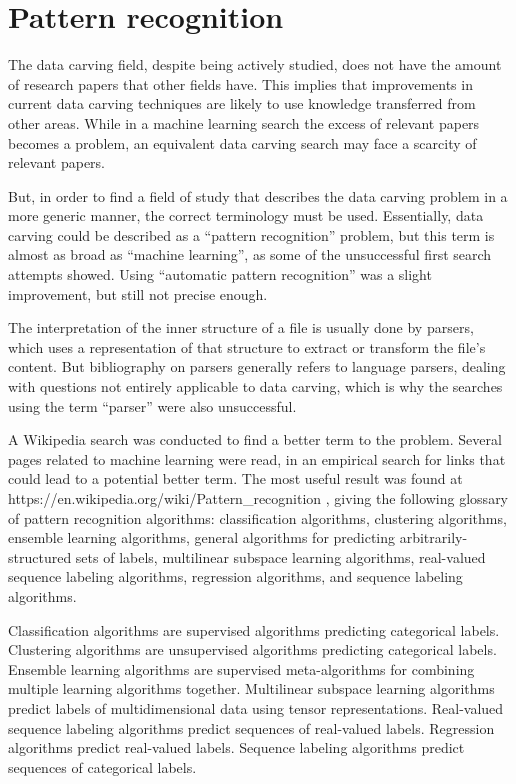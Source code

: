 \section {Pattern recognition}
The data carving field, despite being actively studied, does not have the amount of research papers that other fields have. This implies that improvements in current data carving techniques are likely to use knowledge transferred from other areas. While in a machine learning search the excess of relevant papers becomes a problem, an equivalent data carving search may face a scarcity of relevant papers.

But, in order to find a field of study that describes the data carving problem in a more generic manner, the correct terminology must be used. Essentially, data carving could be described as a  ``pattern recognition'' problem, but this term is almost as broad as ``machine learning'', as some of the unsuccessful first search attempts showed. Using ``automatic pattern recognition'' was a slight improvement, but still not precise enough.

The interpretation of the inner structure of a file is usually done by parsers, which uses a representation of that structure to extract or transform the file's content. But bibliography on parsers generally refers to language parsers, dealing with questions not entirely applicable to data carving, which is why the searches using the term ``parser'' were also unsuccessful.

A Wikipedia search was conducted to find a better term to the problem. Several pages related to machine learning were read, in an empirical search for links that could lead to a potential better term. The most useful result was found at https://en.wikipedia.org/wiki/Pattern\_recognition \cite{wikipedia_editors_pattern_2018}, giving the following glossary of pattern recognition algorithms:
    classification algorithms,
    clustering algorithms,
    ensemble learning algorithms,
    general algorithms for predicting arbitrarily-structured
    sets of labels,
    multilinear subspace learning algorithms,
    real-valued sequence labeling algorithms,
    regression algorithms, and
    sequence labeling algorithms.

    Classification algorithms
    are supervised algorithms predicting categorical labels. Clustering algorithms
    are unsupervised algorithms predicting categorical labels.
    Ensemble learning algorithms
    are supervised meta-algorithms for combining multiple learning algorithms together.
    Multilinear subspace learning algorithms
    predict labels of multidimensional data using tensor representations.
    Real-valued sequence labeling algorithms
    predict sequences of real-valued labels.
    Regression algorithms
    predict real-valued labels.
    Sequence labeling algorithms 
    predict sequences of categorical labels.

